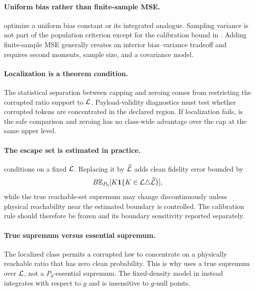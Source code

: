 \paragraph{Uniform bias rather than finite-sample MSE.}
 optimize a uniform bias constant or its integrated analogue. Sampling variance is not part of the population criterion except for the calibration bound in . Adding finite-sample MSE generally creates an interior bias--variance tradeoff and requires second moments, sample size, and a covariance model.

\paragraph{Localization is a theorem condition.}
The statistical separation between capping and zeroing comes from restricting the corrupted ratio support to $\mathcal{L}$. Payload-validity diagnostics must test whether corrupted tokens are concentrated in the declared region. If localization fails,  is the safe comparison and zeroing has no class-wide advantage over the cap at the same upper level.

\paragraph{The escape set is estimated in practice.}
 conditions on a fixed $\mathcal{L}$. Replacing it by $\widehat{\mathcal{L}}$ adds clean fidelity error bounded by
\begin{equation}
B\mathbb{E}_{P_0}[K\mathbf{1}\{K\in\mathcal{L}\triangle\widehat{\mathcal{L}}\}],
\end{equation}
while the true reachable-set supremum may change discontinuously unless physical reachability near the estimated boundary is controlled. The calibration rule should therefore be frozen and its boundary sensitivity reported separately.

\paragraph{True supremum versus essential supremum.}
The localized class permits a corrupted law to concentrate on a physically reachable ratio that has zero clean probability. This is why  uses a true supremum over $\mathcal{L}$, not a $P_0$-essential supremum. The fixed-density model in  instead integrates with respect to $g$ and is insensitive to $g$-null points.

